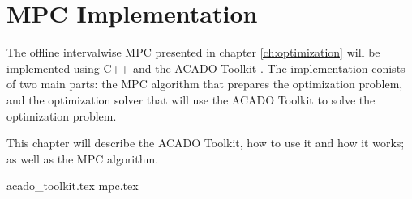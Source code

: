 \chapter{MPC Implementation}

The offline intervalwise MPC presented in chapter \ref{ch:optimization} will be implemented using C++ and the ACADO Toolkit \cite{acadoHOUSKA}. The implementation conists of two main parts: the MPC algorithm that prepares the optimization problem, and the optimization solver that will use the ACADO Toolkit to solve the optimization problem.

This chapter will describe the ACADO Toolkit, how to use it and how it works; as well as the MPC algorithm.


{acado_toolkit.tex}
{mpc.tex}